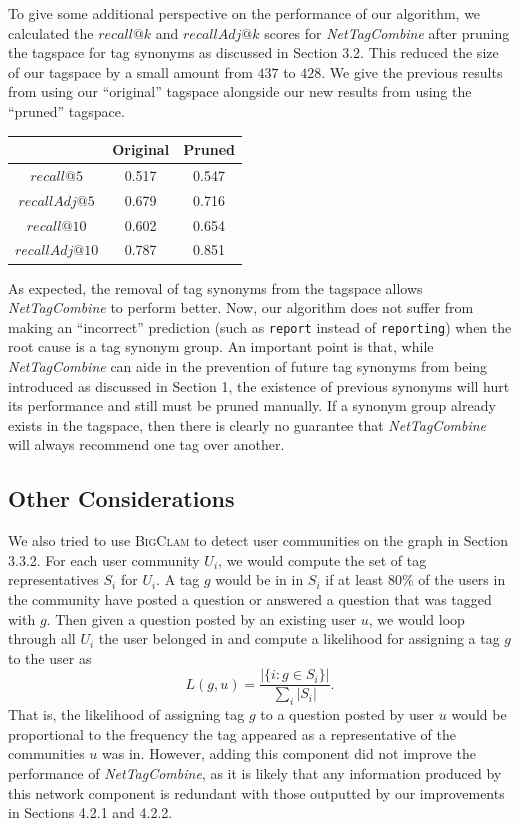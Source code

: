 \documentclass[10pt]{IEEEtran}
\begin{document}
To give some additional perspective on the performance of our algorithm, we calculated the $recall@k$ and $recallAdj@k$ scores for \textit{NetTagCombine} after pruning the tagspace for tag synonyms as discussed in Section 3.2. This reduced the size of our tagspace by a small amount from $437$ to $428$. We give the previous results from using our ``original'' tagspace alongside our new results from using the ``pruned'' tagspace.
\begin{center}\begin{tabular}{c||c|c}
& Original & Pruned\\ \hline\hline
$recall@5$ & 0.517 & 0.547\\ \hline
$recallAdj@5$ & 0.679 & 0.716\\ \hline
$recall@10$ & 0.602 & 0.654\\ \hline
$recallAdj@10$ & 0.787 & 0.851\\
\end{tabular}\end{center}
As expected, the removal of tag synonyms from the tagspace allows \textit{NetTagCombine} to perform better. Now, our algorithm does not suffer from making an ``incorrect'' prediction (such as \texttt{report} instead of \texttt{reporting}) when the root cause is a tag synonym group. An important point is that, while \textit{NetTagCombine} can aide in the prevention of future tag synonyms from being introduced as discussed in Section 1, the existence of previous synonyms will hurt its performance and still must be pruned manually. If a synonym group already exists in the tagspace, then there is clearly no guarantee that \textit{NetTagCombine} will always recommend one tag over another.

\subsection{Other Considerations}

We also tried to use \textsc{BigClam} to detect user communities on the graph in Section 3.3.2. For each user community $U_i$, we would compute the set of tag representatives $S_i$ for $U_i$. A tag $g$ would be in in $S_i$ if at least $80\%$ of the users in the community have posted a question or answered a question that was tagged with $g$. Then given a question posted by an existing user $u$, we would loop through all $U_i$ the user belonged in and compute a likelihood for assigning a tag $g$ to the user as
\[ L(g, u) = \frac{|\{i : g \in S_i\} |}{\sum_i |S_i|}. \]
That is, the likelihood of assigning tag $g$ to a question posted by user $u$ would be proportional to the frequency the tag appeared as a representative of the communities $u$ was in. However, adding this component did not improve the performance of \textit{NetTagCombine}, as it is likely that any information produced by this network component is redundant with those outputted by our improvements in Sections 4.2.1 and 4.2.2.
\end{document}
